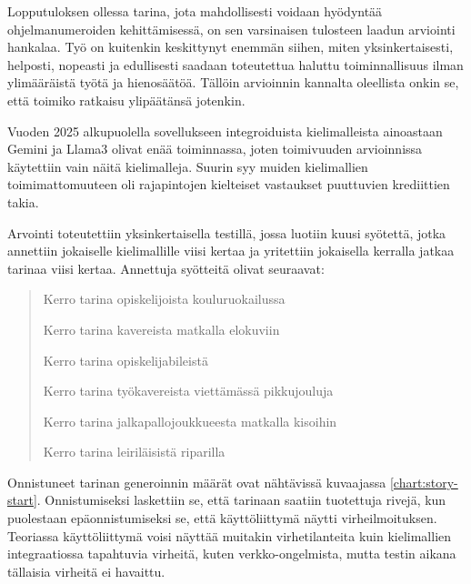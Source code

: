 Lopputuloksen ollessa tarina, jota mahdollisesti voidaan hyödyntää
ohjelmanumeroiden kehittämisessä, on sen varsinaisen tulosteen laadun arviointi
hankalaa. Työ on kuitenkin keskittynyt enemmän siihen, miten yksinkertaisesti,
helposti, nopeasti ja edullisesti saadaan toteutettua haluttu toiminnallisuus
ilman ylimääräistä työtä ja hienosäätöä. Tällöin arvioinnin kannalta oleellista
onkin se, että toimiko ratkaisu ylipäätänsä jotenkin.

Vuoden 2025 alkupuolella sovellukseen integroiduista kielimalleista ainoastaan
Gemini ja Llama3 olivat enää toiminnassa, joten toimivuuden arvioinnissa
käytettiin vain näitä kielimalleja. Suurin syy muiden kielimallien
toimimattomuuteen oli rajapintojen kielteiset vastaukset puuttuvien krediittien
takia.

Arvointi toteutettiin yksinkertaisella testillä, jossa luotiin kuusi syötettä,
jotka annettiin jokaiselle kielimallille viisi kertaa ja yritettiin jokaisella
kerralla jatkaa tarinaa viisi kertaa. Annettuja syötteitä olivat seuraavat:

\begin{quotation}
    \noindent Kerro tarina opiskelijoista kouluruokailussa

    \noindent Kerro tarina kavereista matkalla elokuviin

    \noindent Kerro tarina opiskelijabileistä

    \noindent Kerro tarina työkavereista viettämässä pikkujouluja

    \noindent Kerro tarina jalkapallojoukkueesta matkalla kisoihin

    \noindent Kerro tarina leiriläisistä riparilla
\end{quotation}

Onnistuneet tarinan generoinnin määrät ovat nähtävissä kuvaajassa
\ref{chart:story-start}. Onnistumiseksi laskettiin se, että tarinaan saatiin
tuotettuja rivejä, kun puolestaan epäonnistumiseksi se, että käyttöliittymä
näytti virheilmoituksen. Teoriassa käyttöliittymä voisi näyttää muitakin
virhetilanteita kuin kielimallien integraatiossa tapahtuvia virheitä, kuten
verkko-ongelmista, mutta testin aikana tällaisia virheitä ei havaittu.

